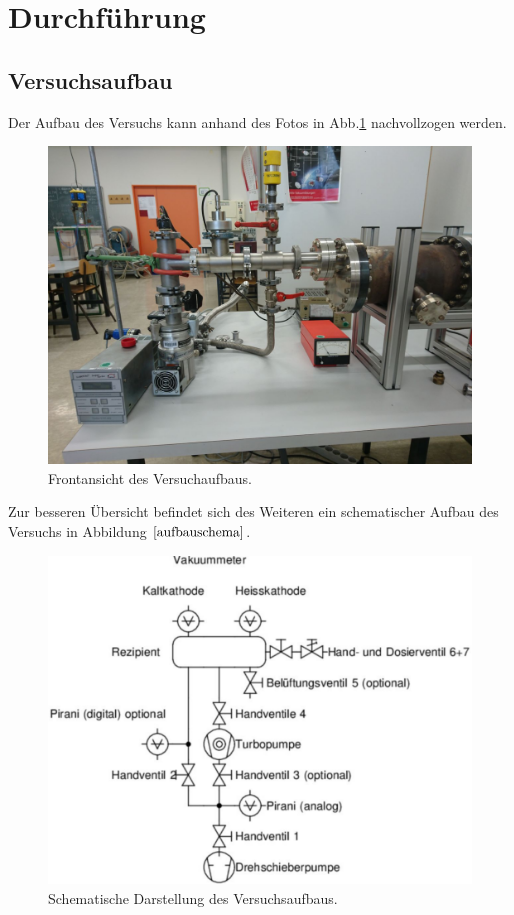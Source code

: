 \section{Durchführung}
\subsection{Versuchsaufbau}
Der Aufbau des Versuchs kann anhand des Fotos in Abb.\ref{fotosaufbau1} nachvollzogen werden.

\begin{figure}[H]
  \centering
  \includegraphics[scale=0.2]{Bilder/Versuch2.jpg}
  \caption{Frontansicht des Versuchaufbaus.}
  \label{fotosaufbau1}
\end{figure}
Zur besseren Übersicht befindet sich des Weiteren ein schematischer Aufbau des Versuchs in Abbildung $\ref{aufbauschema}$.
\begin{figure}[H]
  \centering
  \includegraphics[scale=0.4]{Bilder/schemaVersuch.png}
  \caption{Schematische Darstellung des Versuchsaufbaus.\cite{anleitung}}
  \label{aufbauschema}
\end{figure}
